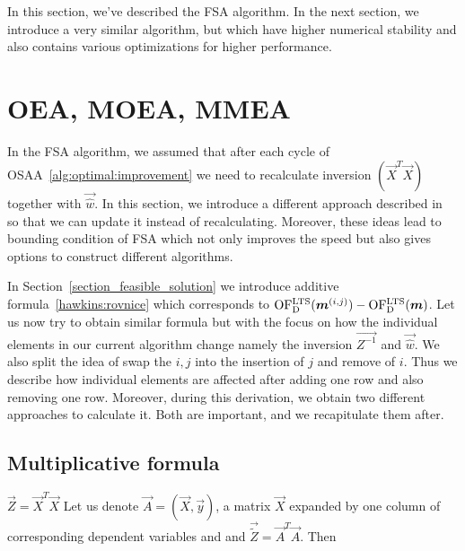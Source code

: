 In this section, we've described the FSA algorithm. In the next section, we introduce a very similar algorithm, but which have higher numerical stability and also contains various optimizations for higher performance.








\section{OEA, MOEA, MMEA} \label{oeamoeammea}

In the FSA algorithm, we assumed that after each cycle of OSAA~\ref{alg:optimal:improvement} we need to recalculate inversion $(\vec{X}^T\vec{X})$ together with $\vec{\hat{w}}$. In this section, we introduce a different approach described in~\cite{agullo2001new} so that we can update it instead of recalculating. Moreover, these ideas lead to bounding condition of FSA which not only improves the speed but also gives options to construct different algorithms. 

In Section~\ref{section_feasible_solution} we introduce additive formula~\eqref{hawkins:rovnice} which corresponds to $\operatorname{OF^{LTS}_D}(\boldsymbol{m}^{(i,j)}) - \operatorname{OF^{LTS}_D}(\boldsymbol{m})$. Let us now try to obtain similar formula but with the focus on how the individual elements in our current algorithm change namely the inversion $\vec{Z^{-1}}$ and $\vec{\hat{w}}$. We also split the idea of swap the $i, j$ into the insertion of $j$ and remove of $i$. Thus we describe how individual elements are affected after adding one row and also removing one row. Moreover, during this derivation, we obtain two different approaches to calculate it. Both are important, and we recapitulate them after.





\subsection{Multiplicative formula}



$\vec{Z} = \vec{X}^T\vec{X}$
Let us denote $\vec{A} = (\vec{X}, \vec{y})$, a matrix $\vec{X}$ expanded by one column of corresponding dependent variables and and $\vec{\tilde{Z}} = \vec{A}^T\vec{A}$. Then

